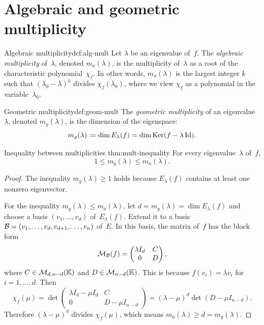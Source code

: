 \section{Algebraic and geometric multiplicity}\label{sec:multiplicities}

\begin{definition}{Algebraic multiplicity}{def:alg-mult}
Let $\lambda$ be an eigenvalue of~$f$.  The \emph{algebraic
multiplicity} of~$\lambda$, denoted $m_a(\lambda)$, is the
multiplicity of~$\lambda$ as a root of the characteristic
polynomial~$\chi_f$.  In other words, $m_a(\lambda)$ is the largest
integer $k$ such that $(\lambda_0 - \lambda)^k$ divides
$\chi_f(\lambda_0)$, where we view $\chi_f$ as a polynomial in the
variable~$\lambda_0$.
\end{definition}

\begin{definition}{Geometric multiplicity}{def:geom-mult}
The \emph{geometric multiplicity} of an eigenvalue~$\lambda$,
denoted $m_g(\lambda)$, is the dimension of the eigenspace:
\[
  m_g(\lambda) \coloneqq \dim E_\lambda(f) = \dim\operatorname{Ker}(f - \lambda\operatorname{Id}).
\]
\end{definition}

\begin{theorem}{Inequality between multiplicities}%
{thm:mult-inequality}
For every eigenvalue~$\lambda$ of~$f$,
\[
  1 \leq m_g(\lambda) \leq m_a(\lambda).
\]
\end{theorem}

\begin{proof}
The inequality $m_g(\lambda) \geq 1$ holds because $E_\lambda(f)$
contains at least one nonzero eigenvector.

For the inequality $m_g(\lambda) \leq m_a(\lambda)$, let
$d = m_g(\lambda) = \dim E_\lambda(f)$ and choose a basis
$(v_1,\ldots,v_d)$ of~$E_\lambda(f)$.  Extend it to a basis
${\mathcal{B}} = (v_1,\ldots,v_d,v_{d+1},\ldots,v_n)$ of~$E$.  In this basis,
the matrix of~$f$ has the block form
\[
  \mathcal{M}_{\mathcal{B}}(f) = \begin{pmatrix} \lambda I_d & C \\ 0 & D \end{pmatrix},
\]
where $C\in\mathcal{M}_{d,n-d}({\mathbb{K}})$ and $D\in\mathcal{M}_{n-d}({\mathbb{K}})$.  This is
because $f(v_i) = \lambda v_i$ for $i = 1,\ldots,d$.  Then
\[
  \chi_f(\mu) = \det\begin{pmatrix} \lambda I_d - \mu I_d & C \\
    0 & D - \mu I_{n-d} \end{pmatrix}
  = (\lambda - \mu)^d \det(D - \mu I_{n-d}).
\]
Therefore $(\lambda - \mu)^d$ divides $\chi_f(\mu)$, which means
$m_a(\lambda) \geq d = m_g(\lambda)$.
\end{proof}

